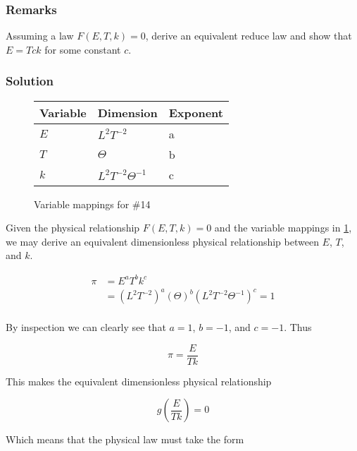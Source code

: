 \documentclass[12pt]{article}
\begin{document}
  \subsubsection*{Remarks}
  Assuming a law $F(E,T,k)=0$, derive an equivalent reduce law and show that
  $E=Tck$ for some constant $c$.

  \subsubsection*{Solution}

  \begin{figure}
    \centering
    \begin{tabularx}{0.5\textwidth}{XXX}
      Variable & Dimension & Exponent \\ \hline
      $E$ & $L^2T^{-2}$ & a \\
      $T$ & $\Theta$ & b \\
      $k$ & $L^2T^{-2}\Theta^{-1}$ & c \\
    \end{tabularx}
    \caption{Variable mappings for \#14}
    \label{fig:14-var-mappings}
  \end{figure}

  Given the physical relationship $F(E,T,k)=0$ and the variable mappings in
  \cref{fig:14-var-mappings}, we may derive an equivalent dimensionless physical
  relationship between $E$, $T$, and $k$.

  \begin{equation}
    \begin{aligned}
      \pi &= E^aT^bk^c \\
      &= (L^2T^{-2})^a (\Theta)^{b} (L^2T^{-2}\Theta^{-1})^c = 1\\
    \end{aligned}
  \end{equation}

  By inspection we can clearly see that $a=1$, $b=-1$, and $c=-1$. Thus

  \begin{equation}
    \pi = \frac{E}{Tk}
  \end{equation}

  This makes the equivalent dimensionless physical relationship

  \begin{equation}
    g\left(\frac{E}{Tk}\right) = 0
  \end{equation}

  Which means that the physical law must take the form
\end{document}

